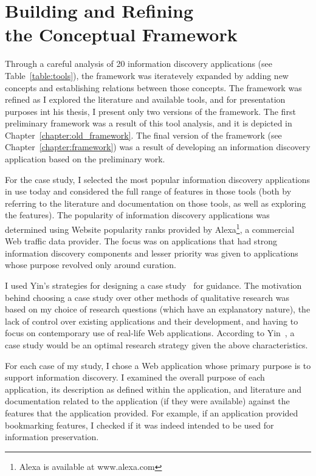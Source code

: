 {\section{Building and Refining \\the Conceptual Framework}
Through a careful analysis of 20 information discovery applications (see Table~\ref{table:tools}), the framework was iteratevely expanded by adding new concepts and establishing relations between those concepts.  The framework was refined as I explored the literature and available tools, and for presentation purposes int his thesis, I present only two versions of the framework. The first preliminary framework was a result of this tool analysis, and it is depicted in Chapter~\ref{chapter:old_framework}. The final version of the framework (see Chapter~\ref{chapter:framework}) was a result of developing an information discovery application based on the preliminary work.    

For the case study, I selected the most popular information discovery applications in use today and considered the full range of features in those tools (both by referring to the literature and documentation on those tools, as well as exploring the features). The popularity of information discovery applications was determined using Website popularity ranks provided by Alexa\footnote[1]{Alexa is available at www.alexa.com}, a commercial Web traffic data provider. The focus was on applications that had strong information discovery components and lesser priority was given to applications whose purpose revolved only around curation.

I used Yin’s strategies for designing a case study~\cite{yin2014case} for guidance. The motivation behind choosing a case study over other methods of qualitative research was based on my choice of research questions (which have an explanatory nature), the lack of control over existing applications and their development, and having to focus on contemporary use of real-life Web applications. According to Yin~\cite{yin2014case}, a case study would be an optimal research strategy given the above characteristics.

For each case of my study, I chose a Web application whose primary purpose is to support information discovery. I examined the overall purpose of each application, its description as defined within the application, and literature and documentation related to the application (if they were available) against the features that the application provided. For example, if an application provided bookmarking features, I checked if it was indeed intended to be used for information preservation. 

}
